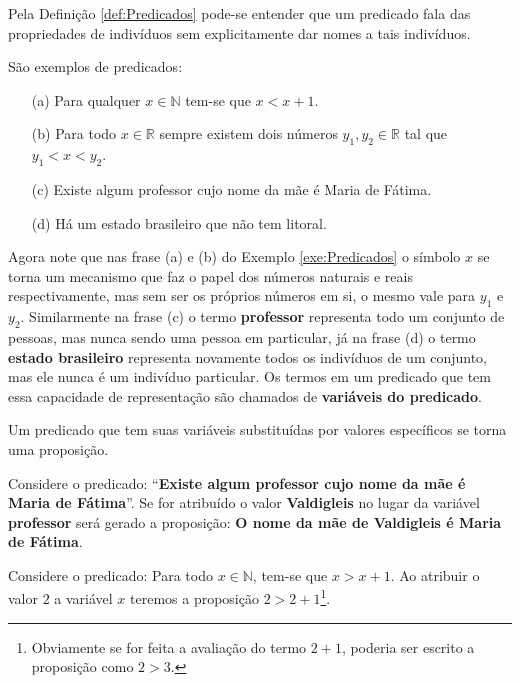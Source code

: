 Pela Definição \ref{def:Predicados} pode-se entender que um predicado fala das propriedades de indivíduos sem explicitamente dar nomes a tais indivíduos.

\begin{exemplo}\label{exe:Predicados}
	São exemplos de predicados:
	\begin{itemize}
		\item[(a)] Para qualquer $x \in \mathbb{N}$ tem-se que $x < x + 1$.
		\item[(b)] Para todo $x \in \mathbb{R}$ sempre existem dois números $y_1, y_2 \in \mathbb{R}$ tal que $y_1 < x < y_2$.
		\item[(c)] Existe algum professor cujo nome da mãe é Maria de Fátima.
		\item[(d)] Há um estado brasileiro que não tem litoral.
	\end{itemize}
\end{exemplo}

Agora note que nas frase (a) e (b) do Exemplo \ref{exe:Predicados} o símbolo $x$ se torna um mecanismo que faz o papel dos números naturais e reais respectivamente, mas sem ser os próprios números em si, o mesmo vale para $y_1$ e $y_2$. Similarmente na frase (c) o termo \textbf{professor} representa todo um conjunto de pessoas, mas nunca sendo uma pessoa em particular, já na frase (d) o termo \textbf{estado brasileiro} representa novamente todos os indivíduos de um conjunto, mas ele nunca é um indivíduo particular. Os termos em um predicado que tem essa capacidade de representação são chamados de \textbf{variáveis do predicado}.

\begin{nota}
  Um predicado que tem suas variáveis substituídas por valores específicos se torna uma proposição. 
\end{nota}

\begin{exemplo}\label{exe:AtribuirVariavelPredicado1}
	Considere o predicado: ``\textbf{Existe algum professor cujo nome da mãe é Maria de Fátima}''. Se for atribuído o valor  \textbf{Valdigleis} no lugar da variável \textbf{professor} será gerado a proposição: \textbf{O nome da mãe de Valdigleis é Maria de Fátima}.
\end{exemplo}

\begin{exemplo}\label{exe:AtribuirVariavelPredicado2}
	Considere o predicado: Para todo $x \in \mathbb{N}$, tem-se que $x > x + 1$. Ao atribuir o valor $2$ a variável $x$ teremos a proposição $2 > 2 + 1$\footnote{Obviamente se for feita a avaliação do termo $2 + 1$, poderia ser escrito a proposição como $2 > 3$.}.
\end{exemplo}

